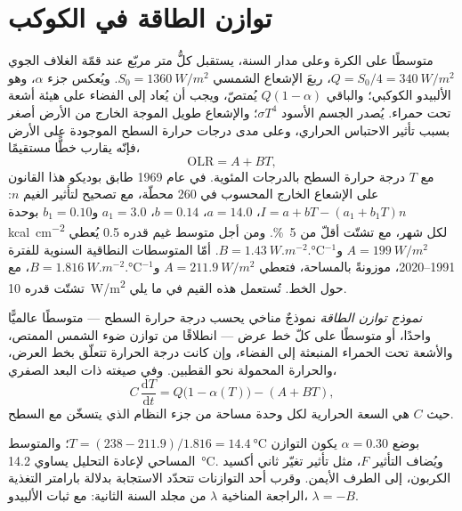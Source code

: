 \section{توازن الطاقة في الكوكب}\label{sec:b3:climate-models:zero-d}

متوسطًا على الكرة وعلى مدار السنة، يستقبل كلُّ متر مربّع عند قمّة
الغلاف الجوي $Q = S_0/4 = \qty{340}{W/m^2}$، ربعَ
الإشعاع الشمسي $S_0 = \qty{1360}{W/m^2}$. ويُعكس جزء $\alpha$، وهو الألبيدو
الكوكبي؛ والباقي $Q(1 - \alpha)$ يُمتصّ،
ويجب أن يُعاد إلى الفضاء على هيئة أشعة تحت حمراء. يُصدر الجسم الأسود $\sigma
T^4$؛ والإشعاع طويل الموجة الخارج من الأرض  أصغر بسبب
تأثير الاحتباس الحراري، وعلى مدى درجات حرارة السطح الموجودة على
الأرض فإنّه يقارب خطًّا مستقيمًا،
\[
\text{OLR} = A + BT ,
\]
مع $T$ درجة حرارة السطح بالدرجات المئوية. في عام 1969 طابق بوديكو
هذا القانون على الإشعاع الخارج المحسوب في 260 محطّة، مع تصحيح
لتأثير الغيم $n$: $I = a + bT - (a_1 + b_1T)n$، $a = 14.0$، $b = 0.14$، $a_1 =
3.0$ و$b_1 = 0.10$ بوحدة \unit{kcal.cm^{-2}} لكل شهر، مع تشتّت أقلّ من
\qty{5}{\percent}. ومن أجل متوسط غيم قدره 0.5 يُعطي $A =
\qty{199}{W/m^2}$ و$B = \qty{1.43}{W.m^{-2}.\celsius^{-1}}$. أمّا المتوسطات
النطاقية السنوية  للفترة 1991--2020، موزونةً بالمساحة،
فتعطي $A = \qty{211.9}{W/m^2}$ و$B = \qty{1.816}{W.m^{-2}.\celsius^{-1}}$،
مع تشتّت قدره \qty{10}{W/m^2} حول الخط. تُستعمل هذه القيم
في ما يلي.

\begin{definition}\label{def:b3:climate-models:ebm}
\emph{نموذج توازن الطاقة} نموذجٌ مناخي
يحسب درجة حرارة السطح --- متوسطًا عالميًّا واحدًا، أو متوسطًا
على كلّ خط عرض --- انطلاقًا من توازن ضوء الشمس الممتص، والأشعة
تحت الحمراء المنبعثة إلى الفضاء، وإن كانت درجة الحرارة تتعلّق بخط العرض،
والحرارة المحمولة نحو القطبين. وفي صيغته ذات البعد الصفري،
\[
C\,\frac{\mathrm dT}{\mathrm dt} = Q\big(1 - \alpha(T)\big) - (A + BT) ,
\]
حيث $C$ هي السعة الحرارية لكل وحدة مساحة من جزء النظام الذي
يتسخّن مع السطح.
\end{definition}

بوضع $\alpha = 0.30$ يكون التوازن $T = (238 - 211.9)/1.816 =
\qty{14.4}{\celsius}$؛ والمتوسط المساحي لإعادة التحليل يساوي
\qty{14.2}{\celsius}. ويُضاف التأثير $F$، مثل تأثير تغيّر ثاني أكسيد الكربون،
إلى الطرف الأيمن. وقرب أحد التوازنات تتحدّد الاستجابة
بدلالة بارامتر التغذية الراجعة المناخية $\lambda$ من مجلد السنة الثانية:
مع ثبات الألبيدو، $\lambda = -B$.


